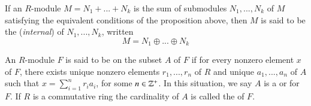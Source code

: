 \documentclass[12pt, a4paper, oneside, openright, titlepage]{book}
\begin{document}
If an $R$-module $M = N_1+...+N_k$ is the sum of submodules $N_1,...,N_k$ of $M$ satisfying the equivalent conditions of the proposition above, then $M$ is said to be the (\emph{internal})  of $N_1,...,N_k$, written \begin{equation*}
    M = N_1\oplus ... \oplus N_k
\end{equation*}


\begin{defn}
    An $R$-module $F$ is said to be  on the subset $A$ of $F$ if for every nonzero element $x$ of $F$, there exists unique nonzero elements $r_1,...,r_n$ of $R$ and unique $a_1,...,a_n$ of $A$ such that $x = \sum_{i=1}^nr_ia_i$, for some $n \in \mathbb Z^+$. In this situation, we say $A$ is a  or  for $F$. If $R$ is a commutative ring the cardinality of $A$ is called the  of $F$.
\end{defn}
\end{document}
